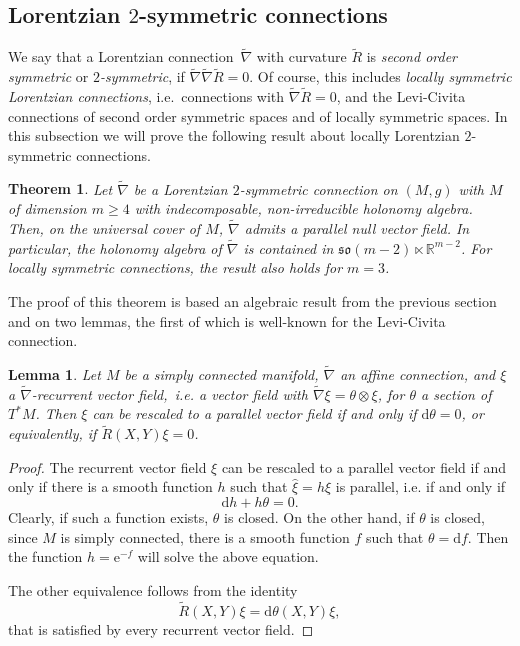 \documentclass[11pt,a4paper]{amsart}
\newcommand{\tnab}{\widetilde{\nabla}}
\newcommand{\tR}{\widetilde{R}}
\newcommand{\+}{\oplus}
\newcommand{\so}{\mathfrak{so}}
\newcommand{\1}{\mathbf{1}}
\newcommand{\e}{\mathrm{e}}
\renewcommand{\d}{\mathrm{d}}
\newcommand{\R}{\mathbb{R}} %
\newcommand{\<}{\langle}
\renewcommand{\>}{\rangle}
\theoremstyle{definition}
\theoremstyle{plain}
\newtheorem{lemma}[definition]{Lemma}
\newtheorem{theorem}[definition]{Theorem}
\numberwithin{equation}{section}
\begin{document}
\subsection{Lorentzian $2$-symmetric connections}
We say that a Lorentzian connection~$\tnab$ with curvature $\tR$ is {\em second order symmetric} or {\em $2$-symmetric}, if $\tnab\tnab\tR=0$. 
Of course, this includes {\em locally symmetric Lorentzian connections}, i.e.~connections with $\tnab\tR=0$, and the Levi-Civita connections of second order symmetric spaces \cite{senovilla08,AlekseevskyGalaev11} and of locally symmetric spaces.
In this subsection we will prove the following result about locally  Lorentzian $2$-symmetric connections.
\begin{theorem}\label{VFtheo}
Let $\tnab$ be a  Lorentzian  $2$-symmetric connection on $(M,g)$ with $M$  of dimension $m\ge 4$ with indecomposable, non-irreducible holonomy algebra. Then, on the universal cover of $M$, $\tnab$  admits a parallel null vector field. In particular, the holonomy algebra of $\tnab$ is contained in $\so(m-2)\ltimes \R^{m-2}$. For locally symmetric connections, the result also holds for $m=3$.
\end{theorem}
The proof of this theorem is based an algebraic result from the previous section and on two lemmas, the first of which is well-known for the Levi-Civita connection. 
\begin{lemma}\label{VFlem1}
Let $M$ be a simply connected manifold, $\tnab$ an affine connection, and $\xi$  a $\tnab$-recurrent vector field,~i.e. a vector field with $\tnab\xi=\theta\otimes \xi$, for $\theta$ a section of $T^*M$. Then $\xi$ can be rescaled to a parallel vector field if and only if $\d \theta=0$, or equivalently, if $\tR(X,Y)\xi=0$.
\end{lemma}
\begin{proof}
The recurrent vector field $\xi$ can be rescaled to a parallel vector field if and only if there is a  smooth function $h$ such that $\hat\xi=h\xi$ is parallel, i.e. if and only if
\[ \d h + h\theta =0.\]
Clearly, if such a function exists, $\theta$ is closed. On the other hand, if $\theta$ is closed, since $M$ is simply connected, there is a smooth function $f$ such that $\theta=\d f$. Then the function $h=\e^{-f}$ will solve the above equation. 

The other equivalence follows from the identity
\begin{equation}
\label{recurv}
\tR(X,Y)\xi=\d\theta (X,Y)\xi,\end{equation}
that is satisfied by every recurrent vector field.
\end{proof}
\end{document}
